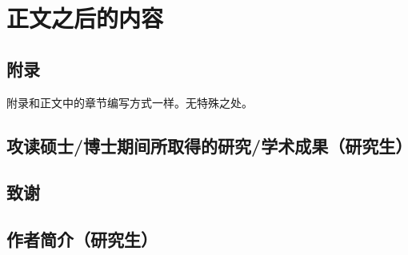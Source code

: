     \section{正文之后的内容}
        \subsection{附录}
            附录和正文中的章节编写方式一样。无特殊之处。
        \subsection{攻读硕士\slash 博士期间所取得的研究\slash 学术成果（研究生）}
        \subsection{致谢}
        \subsection{作者简介（研究生）}